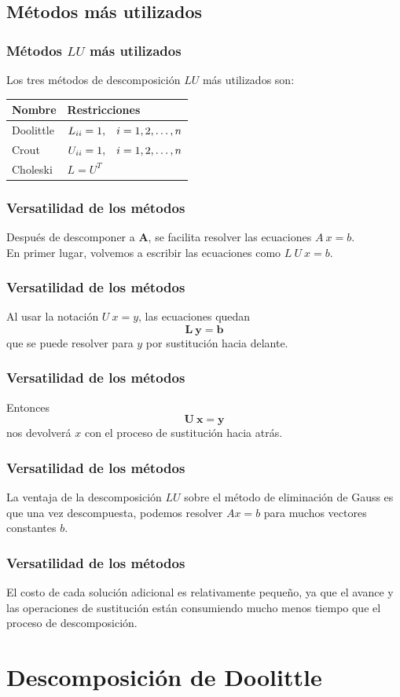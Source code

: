 \subsection*{Métodos más utilizados}
\begin{frame}
\frametitle{Métodos $LU$ más utilizados}
Los tres métodos de descomposición $LU$ más utilizados son:
\begin{center}
	\begin{tabular}{l | l}
		Nombre & Restricciones \\ \hline
		Doolittle & $L_{ii} = 1, \hspace{0.3cm} i= 1,2,\ldots,n$ \\
		Crout & $U_{ii} = 1, \hspace{0.3cm} i=1,2,\ldots,n$ \\
		Choleski & $L = U^{T}$
	\end{tabular}
\end{center}
\end{frame}
\begin{frame}
\frametitle{Versatilidad de los métodos}
Después de descomponer a $\mathbf{A}$, se facilita resolver las ecuaciones $A \: x = b$. 
\\
\bigskip
En primer lugar, volvemos a escribir las ecuaciones como $L \: U \: x = b$.
\end{frame}
\begin{frame}
\frametitle{Versatilidad de los métodos}
Al usar la notación $U \: x = y$, las ecuaciones quedan
\[ \mathbf{L \: y = b} \]
que se puede resolver para $y$ por sustitución hacia delante. 
\end{frame}
\begin{frame}
\frametitle{Versatilidad de los métodos}
Entonces
\[ \mathbf{U \: x = y} \]
nos devolverá $x$ con el proceso de sustitución hacia atrás.
\end{frame}
\begin{frame}
\frametitle{Versatilidad de los métodos}
La ventaja de la descomposición $LU$ sobre el método de eliminación de Gauss es que una vez descompuesta, podemos resolver $Ax = b$ para muchos vectores constantes $b$.
\end{frame}
\begin{frame}
\frametitle{Versatilidad de los métodos}
El costo de cada solución adicional es relativamente pequeño, ya que el avance y las operaciones de sustitución están consumiendo mucho menos tiempo que el proceso de descomposición.
\end{frame}
\section{Descomposición de Doolittle}
